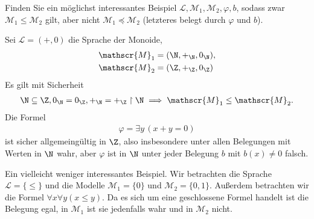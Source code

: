 
\begin{exercise}[142]
Finden Sie ein möglichst interessantes Beispiel $\mathscr{L},\mathscr{M}_1,\mathscr{M}_2,\varphi,b$,
sodass zwar $\mathscr{M}_1 \leq \mathscr{M}_2$ gilt, aber nicht $\mathscr{M}_1 \preccurlyeq \mathscr{M}_2$
(letzteres belegt durch $\varphi$ und $b$).
\end{exercise}


\begin{solution}
Sei $\mathscr{L} = (+,0)$ die Sprache der Monoide,
\begin{align*}
  \mathscr{M}_1 &= (\N,+_\N,0_\N), \\
  \mathscr{M}_2 &= (\Z,+_\Z,0_\Z)
\end{align*}
Es gilt mit Sicherheit
\begin{align*}
  \N \subseteq \Z, 0_\N = 0_\Z, +_\N = +_\Z\upharpoonright \N \implies \mathscr{M}_1 \leq \mathscr{M}_2.
\end{align*}
Die Formel
\begin{align*}
  \varphi = \exists y\,(x+y = 0)
\end{align*}
ist sicher allgemeingültig in $\Z$, also insbesondere unter allen Belegungen mit
Werten in $\N$ wahr, aber $\varphi$ ist in $\N$ unter jeder Belegung $b$ mit $b(x) \neq 0$ falsch.
\end{solution}


\begin{solution}
	Ein vielleicht weniger interessantes Beispiel. Wir betrachten die Sprache $\mathscr{L} = \{\leq\}$ und die Modelle $\mathscr{M}_1 = \{0\}$ und $\mathscr{M}_2 = \{0, 1\}$. Außerdem betrachten wir die Formel $\forall x \forall y (x \leq y)$. Da es sich um eine geschlossene Formel handelt ist die Belegung egal, in $\mathscr{M}_1$ ist sie jedenfalls wahr und in $\mathscr{M}_2$ nicht. 
\end{solution}